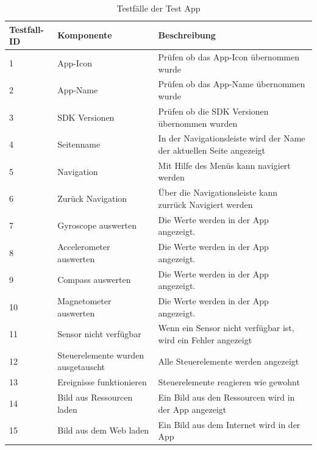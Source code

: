 \begin{table}[!ht]
\begin{tabularx}{\textwidth}{l|l|X}
   \textbf{Testfall-ID} & \textbf{Komponente} & \textbf{Beschreibung} \\
\hline
1             & App-Icon           	& Prüfen ob das App-Icon übernommen wurde                      			 \\ 
2             & App-Name          	& Prüfen ob das App-Name übernommen wurde                      		 \\ 
3             & SDK Versionen      & Prüfen ob die SDK Versionen übernommen wurden                      \\ 
4             & Seitenname           				& In der Navigationsleiste wird der Name der aktuellen Seite angezeigt                      			 \\ 
5          	  & Navigation         			  	& Mit Hilfe des Menüs kann navigiert werden                      			 \\ 
6             & Zurück Navigation           	& Über die Navigationsleiste kann zurrück Navigiert werden                      			 \\ 
7             & Gyroscope auswerten           	& Die Werte werden in der App angezeigt.                      			 \\ 
8             & Accelerometer auswerten           	& Die Werte werden in der App angezeigt.                   			 \\ 
9            & Compass auswerten           	& Die Werte werden in der App angezeigt.                			 \\ 
10            & Magnetometer auswerten           	& Die Werte werden in der App angezeigt.                			 \\ 
11            & Sensor nicht verfügbar           	& Wenn ein Sensor nicht verfügbar ist, wird ein Fehler angezeigt          			 \\ 
12            & Steuerelemente wurden ausgetauscht           	& Alle Steuerelemente werden angezeigt        			 \\ 
13            & Ereignisse funktionieren           	&  Steuerelemente reagieren wie gewohnt     			 \\ 
14            & Bild aus Ressourcen laden           	& Ein Bild aus den Ressourcen wird in der App angezeigt                      			 \\ 
15             & Bild aus dem Web laden           	& Ein Bild aus dem Internet wird in der App                      			 \\ 
\end{tabularx}
\caption{Testfälle der Test App}
 \label{tab:Testapp}
\end{table}




